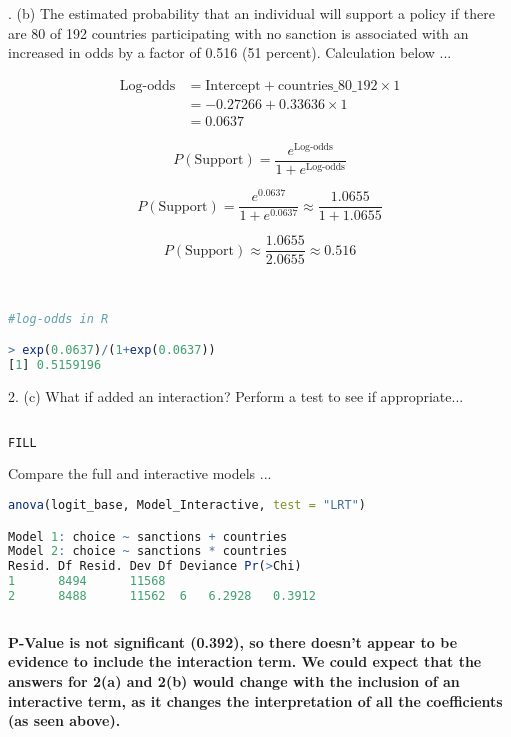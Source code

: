 \documentclass[12pt,letterpaper]{article}
\begin{document}
\vspace{1.0cm}

. (b) The estimated probability that an individual will support a policy if there are 80 of 192 countries participating with no sanction is associated with an increased in odds by a factor of 0.516 (51 percent). Calculation below ...


\begin{align*}
	\text{Log-odds} &= \text{Intercept} + \text{countries\_80\_192} \times 1 \\
	&= -0.27266 + 0.33636 \times 1 \\
	&= 0.0637
\end{align*}

\[
P(\text{Support}) = \frac{e^{\text{Log-odds}}}{1 + e^{\text{Log-odds}}}
\]

\[
P(\text{Support}) = \frac{e^{0.0637}}{1 + e^{0.0637}} \approx \frac{1.0655}{1 + 1.0655}
\]

\[
P(\text{Support}) \approx \frac{1.0655}{2.0655} \approx 0.516
\]

\

\begin{lstlisting}[language=R]
#log-odds in R

> exp(0.0637)/(1+exp(0.0637))
[1] 0.5159196

\end{lstlisting}

\newpage

2. (c) What if added an interaction? Perform a test to see if appropriate... \\

\begin{lstlisting}[language=R]
	
FILL

\end{lstlisting}

\noindent Compare the full and interactive models ...

\begin{lstlisting}[language=R]
anova(logit_base, Model_Interactive, test = "LRT")

Model 1: choice ~ sanctions + countries
Model 2: choice ~ sanctions * countries
Resid. Df Resid. Dev Df Deviance Pr(>Chi)
1      8494      11568                     
2      8488      11562  6   6.2928   0.3912
	
\end{lstlisting}

\noindent \textbf{P-Value is not significant (0.392), so there doesn't appear to be evidence to include the interaction term. We could expect that the answers for 2(a) and 2(b) would change with the inclusion of an interactive term, as it changes the interpretation of all the coefficients (as seen above).}
\end{document}
